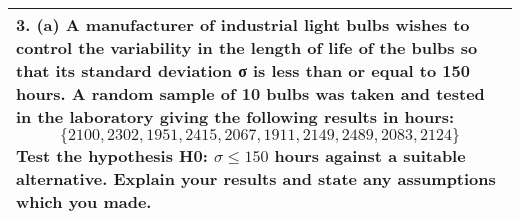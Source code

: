 \documentclass[a4paper,12pt]{article}
\begin{document}
\begin{table}[ht!]
 
\centering
 
\begin{tabular}{|p{15cm}|}
 
\hline  

3. (a) A manufacturer of industrial light bulbs wishes to control the variability in the length of life of the bulbs so that its standard deviation σ is less than or equal to 150 hours.  A random sample of 10 bulbs was taken and tested in the laboratory giving the following results in hours:
\[\{2100,  2302,  1951,  2415,  2067,  1911,  2149,  2489,  2083,  2124\}\]
Test the hypothesis H0: $\sigma \leq 150$ hours against a suitable alternative.  Explain your results and state any assumptions which you made.

\\ \hline
  
\end{tabular}

\end{table}
\end{document}
